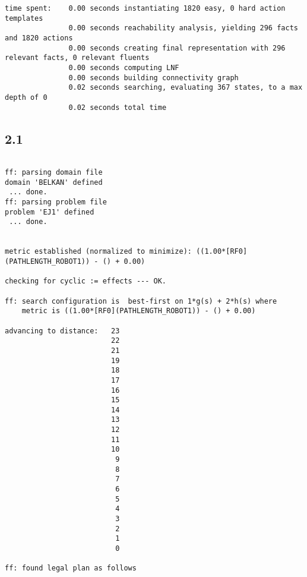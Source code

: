 \documentclass{article}
\begin{document}
\begin{lstlisting}
time spent:    0.00 seconds instantiating 1820 easy, 0 hard action templates
               0.00 seconds reachability analysis, yielding 296 facts and 1820 actions
               0.00 seconds creating final representation with 296 relevant facts, 0 relevant fluents
               0.00 seconds computing LNF
               0.00 seconds building connectivity graph
               0.02 seconds searching, evaluating 367 states, to a max depth of 0
               0.02 seconds total time
\end{lstlisting}
\subsection*{2.1}
\begin{lstlisting}

ff: parsing domain file
domain 'BELKAN' defined
 ... done.
ff: parsing problem file
problem 'EJ1' defined
 ... done.


metric established (normalized to minimize): ((1.00*[RF0](PATHLENGTH_ROBOT1)) - () + 0.00)

checking for cyclic := effects --- OK.

ff: search configuration is  best-first on 1*g(s) + 2*h(s) where
    metric is ((1.00*[RF0](PATHLENGTH_ROBOT1)) - () + 0.00)

advancing to distance:   23
                         22
                         21
                         19
                         18
                         17
                         16
                         15
                         14
                         13
                         12
                         11
                         10
                          9
                          8
                          7
                          6
                          5
                          4
                          3
                          2
                          1
                          0

ff: found legal plan as follows


\end{lstlisting}
\end{document}
